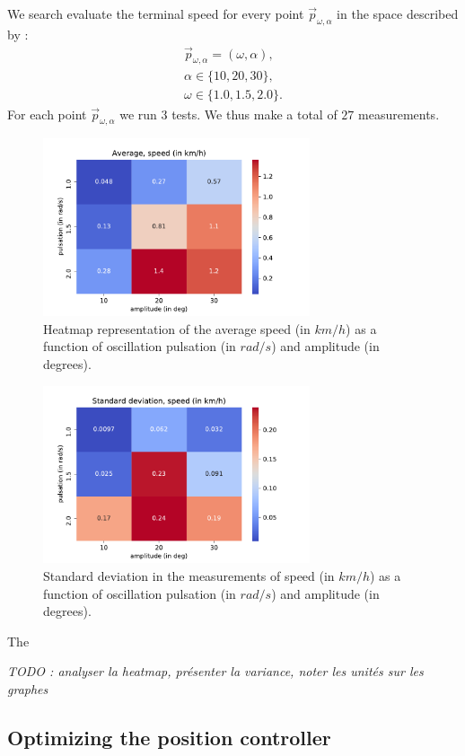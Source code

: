 \documentclass[11pt]{article}
\begin{document}
We search evaluate the terminal speed for every point $\vec{p}_{\omega,\alpha}$ in the space described by :
\begin{align*}
    \vec{p}_{\omega,\alpha} = (\omega, \alpha), \\
    \alpha \in \{ 10, 20, 30 \}, \\
    \omega \in \{ 1.0, 1.5, 2.0 \}. 
\end{align*}
For each point $\vec{p}_{\omega,\alpha}$ we run $3$ tests. We thus make a total of $27$ measurements. 

\begin{figure}
    \centering
    \includegraphics[width=0.7\textwidth]{figures/heatmap_speed.pdf}
    \caption{Heatmap representation of the average speed (in $km/h$) as a function of oscillation pulsation (in $rad/s$) and amplitude (in degrees).}
    \label{fig:heatmap_speed}
\end{figure}
\begin{figure}
    \centering
    \includegraphics[width=0.7\textwidth]{figures/heatmap_var.pdf}
    \caption{Standard deviation in the measurements of speed (in $km/h$) as a function of oscillation pulsation (in $rad/s$) and amplitude (in degrees).}
    \label{fig:heatmap_speed_std}
\end{figure}

The 

\textit{TODO : analyser la heatmap, présenter la variance, noter les unités sur les graphes}
\\

\subsection{Optimizing the position controller}

\printbibliography %
\end{document}
